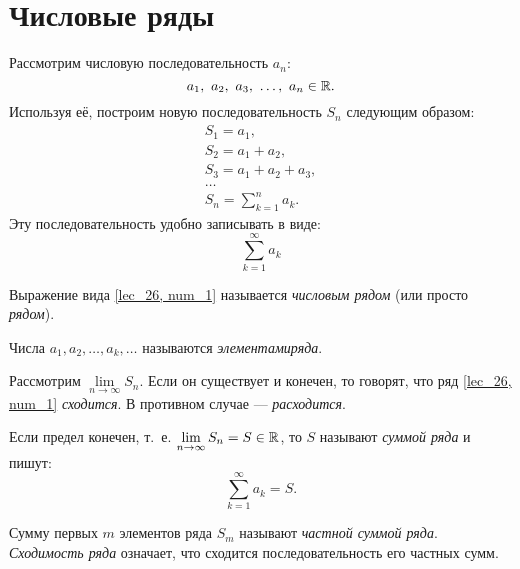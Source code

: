 \documentclass[../../main.tex]{subfiles}
\begin{document}
\section{Числовые ряды}
Рассмотрим числовую последовательность $a_n$:
\[a_1,\  a_2,\  a_3,\  \ldots,\  a_n \in \mathbb{R}.\]
Используя её, построим новую
последовательность $S_n$ следующим образом:
\[
\begin{array}{l}
		S_1 = a_1, \\
		S_2 = a_1 + a_2,\\
		S_3 = a_1 + a_2 + a_3,\\
		\dots\\
		S_n = \sum\limits_{k = 1}^na_k.
\end{array}		
\]
Эту последовательность удобно записывать в виде:
\begin{equation}
	\label{lec_26, num_1}
	 \sum\limits_{k = 1}^\infty a_k
\end{equation}
\begin{definition}
Выражение вида \eqref{lec_26, num_1} называется
\emph{числовым рядом} (или просто \emph{рядом}).
\end{definition}
Числа  $a_1, a_2,  \ldots, a_k,  \ldots$ 
называются \emph{элементами ряда}.

Рассмотрим $\lim\limits_{n \to \infty} S_n$. Если он существует 
и конечен, то говорят, 
что ряд \eqref{lec_26, num_1}  \emph{сходится}. 
В противном случае ---\emph{ расходится}.
\begin{definition}
Если предел конечен, т.~е. 
$\lim\limits_{n \to \infty} S_n = S \in \mathbb{R}$, то $S$ 
называют \emph{суммой ряда} и пишут:
\[
	\sum\limits_{k = 1}^\infty a_k=S
.\]
\end{definition}
Сумму первых $m$ элементов ряда 
$S_m$ называют \emph{частной суммой ряда}. 
\emph{Сходимость ряда} означает,
что сходится последовательность его частных сумм.
\end{document}
